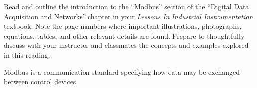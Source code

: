 

Read and outline the introduction to the ``Modbus'' section of the ``Digital Data Acquisition and Networks'' chapter in your {\it Lessons In Industrial Instrumentation} textbook.  Note the page numbers where important illustrations, photographs, equations, tables, and other relevant details are found.  Prepare to thoughtfully discuss with your instructor and classmates the concepts and examples explored in this reading.














Modbus is a communication standard specifying how data may be exchanged between control devices.





